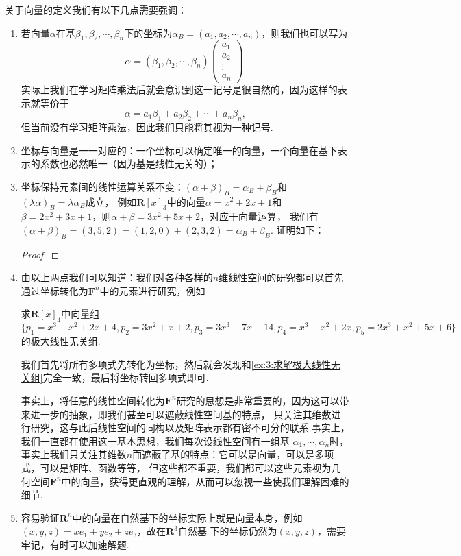 关于向量的定义我们有以下几点需要强调：
\begin{enumerate}
    \item 若向量$\alpha$在基$\beta_1,\beta_2,\cdots,\beta_n$下的坐标为$\alpha_B=(a_1,a_2,\cdots,a_n)$，则我们也可以写为
    \[\alpha=(\beta_1,\beta_2,\cdots,\beta_n)\begin{pmatrix}
        a_1\\a_2\\\vdots\\a_n
    \end{pmatrix}.\]
    实际上我们在学习矩阵乘法后就会意识到这一记号是很自然的，因为这样的表示就等价于
    \[\alpha=a_1\beta_1+a_2\beta_2+\cdots+a_n\beta_n,\]
    但当前没有学习矩阵乘法，因此我们只能将其视为一种记号.
    \item 坐标与向量是一一对应的：一个坐标可以确定唯一的向量，一个向量在基下表示的系数也必然唯一（因为基是线性无关的）；
    \item 坐标保持元素间的线性运算关系不变：$(\alpha+\beta)_B=\alpha_B+\beta_B$和$(\lambda\alpha)_B=\lambda\alpha_B$成立，
    例如$\mathbf{R}[x]_3$中的向量$\alpha=x^2+2x+1$和$\beta=2x^2+3x+1$，则$\alpha+\beta=3x^2+5x+2$，对应于向量运算，
    我们有$(\alpha+\beta)_B=(3,5,2)=(1,2,0)+(2,3,2)=\alpha_B+\beta_B$.
    证明如下：
    
    \begin{proof}
        
    \end{proof}
    \item 由以上两点我们可以知道：我们对各种各样的$n$维线性空间的研究都可以首先通过坐标转化为$\mathbf{F}^n$中的元素进行研究，例如
    \begin{example}\label{ex:3:转化为坐标}
        求$\mathbf{R}[x]_4$中向量组$\{p_1=x^3-x^2+2x+4,p_2=3x^2+x+2,p_3=3x^3+7x+14,p_4=x^3-x^2+2x,p_5=2x^3+x^2+5x+6\}$
        的极大线性无关组.
    \end{example}
    我们首先将所有多项式先转化为坐标，然后就会发现和\autoref{ex:3:求解极大线性无关组}完全一致，最后将坐标转回多项式即可.

    事实上，将任意的线性空间转化为$\mathbf{F}^n$研究的思想是非常重要的，因为这可以带来进一步的抽象，即我们甚至可以遮蔽线性空间基的特点，
    只关注其维数进行研究，这与此后线性空间的同构以及矩阵表示都有密不可分的联系.事实上，我们一直都在使用这一基本思想，我们每次设线性空间有一组基
    $\alpha_1,\cdots,\alpha_n$时，事实上我们只关注其维数$n$而遮蔽了基的特点：它可以是向量，可以是多项式，可以是矩阵、函数等等，
    但这些都不重要，我们都可以这些元素视为几何空间$\mathbf{F}^n$中的向量，获得更直观的理解，从而可以忽视一些使我们理解困难的细节.
    \item 容易验证$\mathbf{R}^n$中的向量在自然基下的坐标实际上就是向量本身，例如$(x,y,z)=xe_1+ye_2+ze_3$，故在$\mathbf{R}^3$自然基
    下的坐标仍然为$(x,y,z)$，需要牢记，有时可以加速解题.
\end{enumerate}

